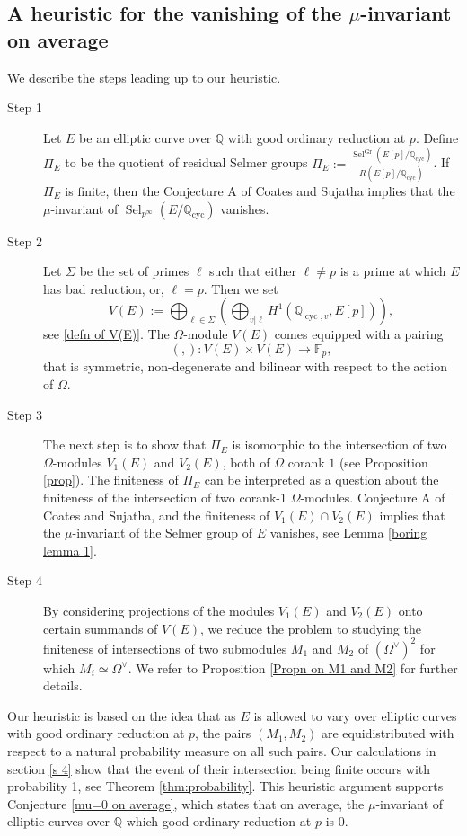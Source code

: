 \documentclass[12pt]{amsart}
\newcommand{\Q}{\mathbb{Q}}
\newcommand{\F}{\mathbb{F}}
\newcommand{\op}[1]{\operatorname{#1}}
\numberwithin{equation}{section}
\begin{document}
\subsection{A heuristic for the vanishing of the $\mu$-invariant on average}
\par We describe the steps leading up to our heuristic.
\begin{description}
    \item[Step 1] Let $E$ be an elliptic curve over $\Q$ with good ordinary reduction at $p$. Define $\Pi_E$ to be the quotient of residual Selmer groups $ \Pi_E := \frac{\operatorname{Sel}^{\operatorname{Gr}}(E[p]/\mathbb{Q}_{\operatorname{cyc}})}{R(E[p]/\mathbb{Q}_{\operatorname{cyc}})} $. If $\Pi_E$ is finite, then the Conjecture A of Coates and Sujatha implies that the $\mu$-invariant of  $\op{Sel}_{p^\infty}(E/\Q_{\op{cyc}})$ vanishes.
    \item[Step 2] Let $\Sigma$ be the set of primes $\ell$ such that either $\ell\neq p$ is a prime at which $E$ has bad reduction, or, $\ell=p$. Then we set 
\[V(E):=\bigoplus_{\ell\in \Sigma} \left(\bigoplus_{v|\ell} H^1(\Q_{\op{cyc}, v}, E[p]) \right),\] see \eqref{defn of V(E)}. The $\Omega$-module $V(E)$ comes equipped with a pairing 
\[(,): V(E)\times V(E) \rightarrow \F_p,\] that is symmetric, non-degenerate and bilinear with respect to the action of $\Omega$.
\item[Step 3] The next step is to show that $ \Pi_E $ is isomorphic to the intersection of two $ \Omega $-modules $ V_1(E) $ and $ V_2(E) $, both of $\Omega$ corank $1$ (see Proposition \ref{prop}). The finiteness of $ \Pi_E $ can be interpreted as a question about the finiteness of the intersection of two corank-1 $ \Omega $-modules. Conjecture A of Coates and Sujatha, and the finiteness of $V_1(E)\cap V_2(E)$ implies that the $\mu$-invariant of the Selmer group of $E$ vanishes, see Lemma \ref{boring lemma 1}.
\item[Step 4] By considering projections of the modules $ V_1(E) $ and $ V_2(E) $ onto certain summands of $ V(E) $, we reduce the problem to studying the finiteness of intersections of two submodules $M_1$ and $M_2$ of $(\Omega^\vee)^2$ for which $M_i\simeq \Omega^\vee$. We refer to Proposition \ref{Propn on M1 and M2} for further details.
\end{description}
 Our heuristic is based on the idea that as $E$ is allowed to vary over elliptic curves with good ordinary reduction at $p$, the pairs $(M_1, M_2)$ are equidistributed with respect to a natural probability measure on all such pairs. Our calculations in section \ref{s 4} show that the event of their intersection being finite occurs with probability 1, see Theorem \ref{thm:probability}. This heuristic argument supports Conjecture \ref{mu=0 on average}, which states that on average, the $ \mu $-invariant of elliptic curves over $ \mathbb{Q} $ which good ordinary reduction at $p$ is $0$. 
\end{document}
